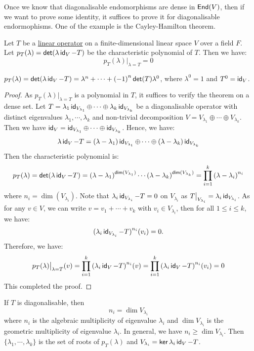 Once we know that diagonalisable endomorphisms are dense in $\operatorname{\text{\normalfont\sffamily End}}(V)$, then if we want to prove some identity, it suffices to prove it for diagonalisable endormophisms. One of the example is the Cayley-Hamilton theorem.

\begin{theorem}
  Let $T$ be a \hyperref[def:linear_operator]{linear operator} on a finite-dimensional linear space $V$ over a field $F$. Let $p_T (\lambda) = \operatorname{\text{\normalfont\sffamily det}} (\lambda \operatorname{\text{\normalfont\sffamily id}}_V - T)$ be the characteristic polynomial of $T$. Then we have:
  \[
    p_T (\lambda)\big|_{\lambda = T} = 0
  \]
\end{theorem}
\begin{remark}
  $p_T (\lambda) = \operatorname{\text{\normalfont\sffamily det}} (\lambda \operatorname{\text{\normalfont\sffamily id}}_V - T) = \lambda^n + \cdots + {(-1)}^n \operatorname{\text{\normalfont\sffamily det}}(T) \lambda^0$, where $\lambda^0 = 1$ and $T^0 = \operatorname{\text{\normalfont\sffamily id}}_V$.
\end{remark}
\begin{proof}
  As $p_T (\lambda)\big|_{\lambda = T}$ is a polynomial in $T$, it suffices to verify the theorem on a dense set. Let $T = \lambda_1 \operatorname{\text{\normalfont\sffamily id}}_{V_{\lambda_1}} \oplus \cdots \oplus \lambda_k \operatorname{\text{\normalfont\sffamily id}}_{V_{\lambda_k}}$ be a diagonalisable operator with distinct eigenvalues $\lambda_1, \cdots, \lambda_k$ and non-trivial decomposition $V = V_{\lambda_1} \oplus \cdots \oplus V_{\lambda_k}$. Then we have $\operatorname{\text{\normalfont\sffamily id}}_V = \operatorname{\text{\normalfont\sffamily id}}_{V_{\lambda_1}} \oplus \cdots \oplus \operatorname{\text{\normalfont\sffamily id}}_{V_{\lambda_k}}$. Hence, we have:
  \[
    \lambda \operatorname{\text{\normalfont\sffamily id}}_V - T = (\lambda - \lambda_1) \operatorname{\text{\normalfont\sffamily id}}_{V_{\lambda_1}} \oplus \cdots \oplus (\lambda - \lambda_k) \operatorname{\text{\normalfont\sffamily id}}_{V_{\lambda_k}}
  \]
  Then the characteristic polynomial is:
  \[
    p_T (\lambda) = \operatorname{\text{\normalfont\sffamily det}} (\lambda \operatorname{\text{\normalfont\sffamily id}}_V - T) = {(\lambda - \lambda_1)}^{\operatorname{\text{\normalfont\sffamily dim}}(V_{\lambda_1})} \cdots {(\lambda - \lambda_k)}^{\operatorname{\text{\normalfont\sffamily dim}}(V_{\lambda_k})} = \prod_{i = 1}^k {(\lambda - \lambda_i)}^{n_i}
  \]
  where $n_i = \dim(V_{\lambda_i})$. Note that $\lambda_i \operatorname{\text{\normalfont\sffamily id}}_{V_{\lambda_i}} - T = 0$ on $V_{\lambda_i}$ as $T\big|_{V_{\lambda_i}} = \lambda_i \operatorname{\text{\normalfont\sffamily id}}_{V_{\lambda_i}}$. As for any $v \in V$, we can write $v = v_1 + \cdots + v_k$ with $v_i \in V_{\lambda_i}$, then for all $1 \leq i \leq k$, we have:
  \[
    {(\lambda_i \operatorname{\text{\normalfont\sffamily id}}_{V_{\lambda_i}} - T)}^{n_i} (v_i) = 0.
  \]
  Therefore, we have:
  \[
    p_T (\lambda)\big|_{\lambda = T} (v) = \prod_{i = 1}^k {(\lambda_i \operatorname{\text{\normalfont\sffamily id}}_V - T)}^{n_i} (v) = \prod_{i = 1}^k {(\lambda_i \operatorname{\text{\normalfont\sffamily id}}_V - T)}^{n_i} (v_i) = 0
  \]
  This completed the proof.
\end{proof}

If $T$ is diagonalisable, then
\[
  n_i = \dim V_{\lambda_i}
\]
where $n_i$ is the algebraic multiplicity of eigenvalue $\lambda_i$ and $\dim V_{\lambda_i}$ is the geometric multiplicity of eigenvalue $\lambda_i$. In general, we have $n_i \geq \dim V_{\lambda_i}$. Then $\{ \lambda_1, \cdots, \lambda_k \}$ is the set of roots of $p_T (\lambda)$ and $V_{\lambda_i} = \operatorname{\text{\normalfont\sffamily ker}}{\lambda_i \operatorname{\text{\normalfont\sffamily id}}_V - T}$.

